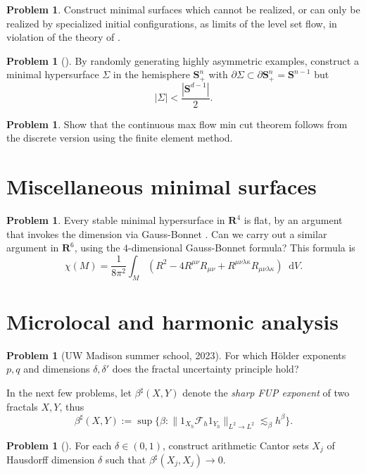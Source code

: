 \documentclass[reqno,11pt]{amsart}
\newcommand{\RR}{\mathbf{R}}
\newcommand{\Sph}{\mathbf S}
\newcommand*\dif{\mathop{}\!\mathrm{d}}
\newcommand{\dfn}[1]{\emph{#1}\index{#1}}
\theoremstyle{definition}
\newtheorem{problem}[theorem]{Problem}
\numberwithin{equation}{section}
\begin{document}
\begin{problem}
Construct minimal surfaces which cannot be realized, or can only be realized by specialized initial configurations, as limits of the level set flow, in violation of the theory of \cite{CHOPP199377}.
\end{problem}

\begin{problem}[{\cite[Conjecture 5.3]{naff2022prescribed}}]
By randomly generating highly asymmetric examples, construct a minimal hypersurface $\Sigma$ in the hemisphere $\Sph^n_+$ with $\partial \Sigma \subset \partial \Sph^n_+ = \Sph^{n - 1}$ but
$$|\Sigma| < \frac{|\Sph^{d - 1}|}{2}.$$
\end{problem}

\begin{problem}
Show that the continuous max flow min cut theorem follows from the discrete version using the finite element method.
\end{problem}

\section{Miscellaneous minimal surfaces}
\begin{problem}
Every stable minimal hypersurface in $\RR^4$ is flat, by an argument that invokes the dimension via Gauss-Bonnet \cite{chodosh2023stable}.
Can we carry out a similar argument in $\RR^6$, using the $4$-dimensional Gauss-Bonnet formula? This formula is 
$$\chi(M) = \frac{1}{8\pi^2} \int_M (R^2 - 4R^{\mu \nu} R_{\mu \nu} + R^{\mu \nu \lambda \kappa} R_{\mu \nu \lambda \kappa}) \dif V.$$
\end{problem}

\section{Microlocal and harmonic analysis}
\begin{problem}[UW Madison summer school, 2023]
For which H\"older exponents $p, q$ and dimensions $\delta, \delta'$ does the fractal uncertainty principle hold?
\end{problem}

In the next few problems, let $\beta^\sharp(X, Y)$ denote the \dfn{sharp FUP exponent} of two fractals $X, Y$, thus
$$\beta^\sharp(X, Y) := \sup \{\beta: \|1_{X_h} \mathscr F_h 1_{Y_h}\|_{L^2 \to L^2} \lesssim_\beta h^\beta\}.$$

\begin{problem}[{\cite[Conjecture 4.4]{Dyatlov_2019}}]
For each $\delta \in (0, 1)$, construct arithmetic Cantor sets $X_j$ of Hausdorff dimension $\delta$ such that $\beta^\sharp(X_j, X_j) \to 0$.
\end{problem}
\end{document}
